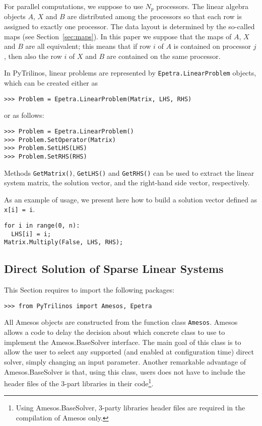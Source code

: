 \documentclass[10pt,relax]{SANDreport}
\newcommand{\PyTrilinos}{{PyTrilinos}}
\begin{document}
For parallel computations, we suppose to use $N_p$ processors. The linear
algebra objects 
$A$, $X$ and $B$ are distributed among the processors so that each row is
assigned to exactly one processor. The data layout is determined by the
so-called maps (see Section~\ref{sec:maps}). In this paper we suppose that the maps of $A$, $X$ and $B$ are
all equivalent; this means that if row $i$ of $A$ is contained on processor
$j$, then also the row $i$ of $X$ and $B$ are contained on the same processor.

In \PyTrilinos, linear problems are represented by {\tt Epetra.LinearProblem}
objects, which can be created either as
\begin{verbatim}
>>> Problem = Epetra.LinearProblem(Matrix, LHS, RHS)
\end{verbatim}
or as follows:
\begin{verbatim}
>>> Problem = Epetra.LinearProblem()
>>> Problem.SetOperator(Matrix)
>>> Problem.SetLHS(LHS)
>>> Problem.SetRHS(RHS)
\end{verbatim}
Methods \verb!GetMatrix()!, \verb!GetLHS()! and \verb!GetRHS()! can be used to
extract the linear system matrix, the solution vector, and the right-hand side
vector, respectively.

As an example of usage, we present here how to build a solution vector
defined as \verb!x[i] = i!.
\begin{verbatim}
for i in range(0, n):
  LHS[i] = i;
Matrix.Multiply(False, LHS, RHS);
\end{verbatim}

\subsection{Direct Solution of Sparse Linear Systems}
\label{sec:direct}

This Section requires to import the following packages:
\begin{verbatim}
>>> from PyTrilinos import Amesos, Epetra
\end{verbatim}

All Amesos objects are constructed from the function class
\verb!Amesos!.  Amesos allows a code to delay the
decision about which concrete class to use to implement the
Amesos.BaseSolver interface. The main goal of this class is to allow
the user to select any supported (and enabled at configuration time)
direct solver, simply changing an input parameter. Another remarkable
advantage of Amesos.BaseSolver is that, using this class, users does
not have to include the header files of the 3-part libraries in their
code\footnote{Using Amesos.BaseSolver, 3-party libraries header files
  are required in the compilation of Amesos only.}.
\end{document}
